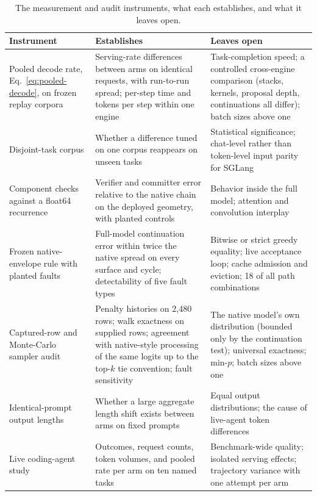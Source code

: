 \documentclass[sigconf,anonymous,review]{acmart}
\begin{document}
\begin{table}[t]
\caption{The measurement and audit instruments, what each establishes, and what it leaves open.}
\label{tab:instruments}
\centering\footnotesize
\renewcommand{\arraystretch}{1.1}
\begin{tabularx}{\textwidth}{@{}>{\raggedright\arraybackslash}p{}YY@{}}
\toprule
Instrument & Establishes & Leaves open \\
\midrule
Pooled decode rate, Eq.~\ref{eq:pooled-decode}, on frozen replay corpora & Serving-rate differences between arms on identical requests, with run-to-run spread; per-step time and tokens per step within one engine & Task-completion speed; a controlled cross-engine comparison (stacks, kernels, proposal depth, continuations all differ); batch sizes above one \\
Disjoint-task corpus & Whether a difference tuned on one corpus reappears on unseen tasks & Statistical significance; chat-level rather than token-level input parity for SGLang \\
Component checks against a float64 recurrence & Verifier and committer error relative to the native chain on the deployed geometry, with planted controls & Behavior inside the full model; attention and convolution interplay \\
Frozen native-envelope rule with planted faults & Full-model continuation error within twice the native spread on every surface and cycle; detectability of five fault types & Bitwise or strict greedy equality; live acceptance loop; cache admission and eviction; 18 of all path combinations \\
Captured-row and Monte-Carlo sampler audit & Penalty histories on 2,480 rows; walk exactness on supplied rows; agreement with native-style processing of the same logits up to the top-$k$ tie convention; fault sensitivity & The native model's own distribution (bounded only by the continuation test); universal exactness; min-$p$; batch sizes above one \\
Identical-prompt output lengths & Whether a large aggregate length shift exists between arms on fixed prompts & Equal output distributions; the cause of live-agent token differences \\
Live coding-agent study & Outcomes, request counts, token volumes, and pooled rate per arm on ten named tasks & Benchmark-wide quality; isolated serving effects; trajectory variance with one attempt per arm \\
\bottomrule
\end{tabularx}
\end{table}
\end{document}
